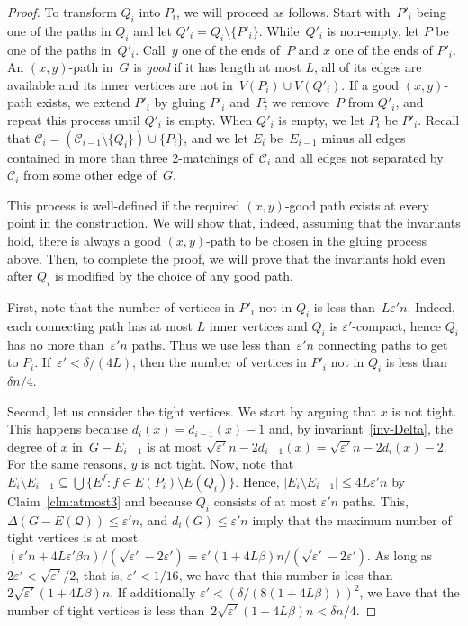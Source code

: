 \documentclass[a4paper, 11pt,reqno]{amsart}
\newcommand{\calC}{\mathcal{C}}
\newcommand{\calQ}{\mathcal{Q}}
\theoremstyle{plain}
\theoremstyle{definition}
\numberwithin{equation}{section}
\newcommand{\eps}{\varepsilon}
\begin{document}
\begin{proof}
  To transform $Q_i$ into $P_i$, we will proceed as follows. 
  Start with~$P'_i$ being one of the paths in $Q_i$ and let $Q'_i = Q_i \setminus \{P'_i\}$.
  While~$Q'_i$ is non-empty, let $P$ be one of the paths in~$Q'_i$.
  Call~$y$ one of the ends of~$P$ and $x$ one of the ends of $P'_i$.
  An $(x,y)$-path in~$G$ is \emph{good} if it has length at most $L$, 
  all of its edges are available and its inner vertices are not in~$V(P_i) \cup V(Q'_i)$.
  If a good $(x,y)$-path exists, we extend $P'_i$ by gluing $P'_i$ and~$P$; 
  we remove~$P$ from $Q'_i$, and repeat this process until $Q'_i$ is empty.
  When $Q'_i$ is empty, we let $P_i$ be $P'_i$. Recall that
  $\calC_i = (\calC_{i-1} \setminus \{Q_i\}) \cup \{P_i\}$, and we let $E_i$ 
  be~$E_{i-1}$ minus all edges contained in more than three 2-matchings of~$\calC_i$ 
  and all edges not separated by~$\calC_i$ from some other edge of~$G$.
  
  This process is well-defined if the required $(x,y)$-good path exists at every point in the construction.
  We will show that, indeed, assuming that the invariants hold, there is 
  always a good $(x,y)$-path to be chosen in the gluing process above. 
  Then, to complete the proof, we will prove that the invariants hold even 
  after $Q_i$ is modified by the choice of any good path.
  
  First, note that the number of vertices in $P'_i$ not in $Q_i$ is less than~$L \eps'n$.
  Indeed, each connecting path has at most $L$ inner vertices and $Q_i$ is $\eps'$-compact, 
  hence $Q_i$ has no more than~$\eps'n$ paths.
  Thus we use less than~$\eps'n$ 
  connecting paths to get to $P_i$.  If~$\eps' < \delta /(4L)$, then 
  the number of vertices in $P'_i$ not in $Q_i$ is less than~$\delta n / 4$.
  
  Second, let us consider the tight vertices. 
  We start by arguing that $x$ is not tight. 
  This happens because $d_i(x) = d_{i-1}(x) - 1$ and, by invariant~\ref{inv-Delta}, 
  the degree of $x$ in~$G-E_{i-1}$ is at most $\sqrt{\eps'}n - 2d_{i-1}(x) = \sqrt{\eps'}n - 2d_i(x) - 2$. 
  For the same reasons, $y$ is not tight. 
  Now, note that $E_{i} \setminus E_{i-1} \subseteq \bigcup \{E^f : f \in E(P_i) \setminus E(Q_i)\}$.  
  Hence, $|E_{i} \setminus E_{i-1}| \leq 4L\eps'n$ by Claim~\ref{clm:atmost3}
  and because $Q_i$ consists of at most $\eps'n$ paths. 
  This, $\Delta(G - E(\calQ)) \leq \eps' n$, and $d_i(G) \leq \eps' n$ imply that the maximum number of tight vertices is 
  at most $(\eps'n + 4L\eps'\beta n)/(\sqrt{\eps'}-2\eps') = \eps'(1 + 4L\beta)n/(\sqrt{\eps'}-2\eps')$.
  As long as~$2\eps' < \sqrt{\eps'}/2$, that is, $\eps' < 1/16$, 
  we have that this number is less than $2\sqrt{\eps'}(1 + 4L\beta)n$.
  If additionally $\eps' < (\delta/(8(1+4L\beta)))^2$, we have that
  the number of tight vertices is less than~$2\sqrt{\eps'}(1+4L\beta)n < \delta n/4$. 
  

\end{proof}
\end{document}
